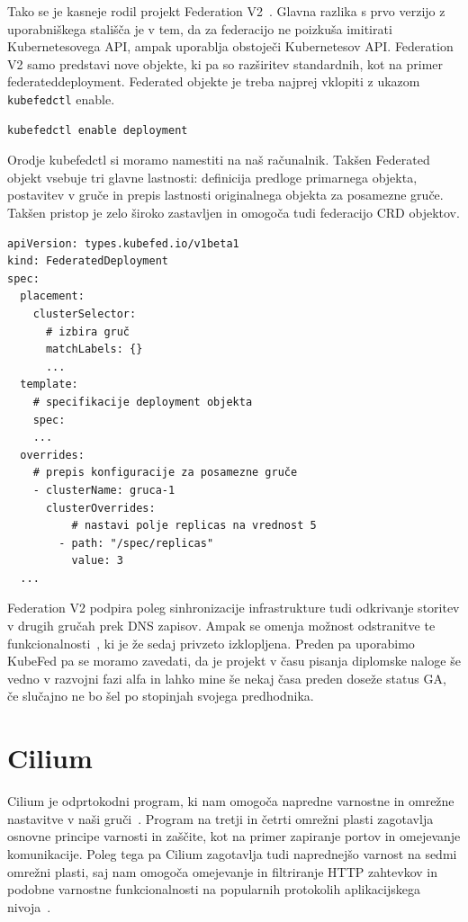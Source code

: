 \documentclass[a4paper, 12pt]{book}
\begin{document}
Tako se je kasneje rodil projekt Federation V2~\cite{Kubernetes-federation-evolution}.
Glavna razlika s prvo verzijo z uporabniškega stališča je v tem, da za federacijo ne poizkuša imitirati Kubernetesovega API, ampak uporablja obstoječi Kubernetesov API. 
Federation V2 samo predstavi nove objekte, ki pa so razširitev standardnih, kot na primer federateddeployment.
Federated objekte je treba najprej vklopiti z ukazom \verb|kubefedctl| enable.
\begin{verbatim}
kubefedctl enable deployment
\end{verbatim}
Orodje kubefedctl si moramo namestiti na naš računalnik.
Takšen Federated objekt vsebuje tri glavne lastnosti: definicija predloge primarnega objekta, postavitev v gruče in prepis lastnosti originalnega objekta za posamezne gruče.
  Takšen pristop je zelo široko zastavljen in omogoča tudi federacijo CRD objektov.
\begin{verbatim}
apiVersion: types.kubefed.io/v1beta1
kind: FederatedDeployment
spec:
  placement:
    clusterSelector:
      # izbira gruč
      matchLabels: {}
      ... 
  template:
    # specifikacije deployment objekta
    spec:
    ... 
  overrides:
    # prepis konfiguracije za posamezne gruče
    - clusterName: gruca-1
      clusterOverrides:
          # nastavi polje replicas na vrednost 5
        - path: "/spec/replicas"
          value: 3
  ... 
\end{verbatim}
Federation V2 podpira poleg sinhronizacije infrastrukture tudi odkrivanje storitev v drugih gručah prek DNS zapisov.
Ampak se omenja možnost odstranitve te funkcionalnosti~\cite{remove-service-discovery}, ki je že sedaj privzeto izklopljena.
Preden pa uporabimo KubeFed pa se moramo zavedati, da je projekt v času pisanja diplomske naloge še vedno v razvojni fazi alfa in lahko mine še nekaj časa preden doseže status GA, če slučajno ne bo šel po stopinjah svojega predhodnika.
\section{Cilium}
Cilium je odprtokodni program, ki nam omogoča napredne varnostne in omrežne nastavitve v naši gruči~\cite{cilium-intro}.
Program na tretji in četrti omrežni plasti zagotavlja osnovne principe varnosti in zaščite, kot na primer zapiranje portov in omejevanje komunikacije.
Poleg tega pa Cilium zagotavlja tudi naprednejšo varnost na sedmi omrežni plasti, saj nam omogoča omejevanje in filtriranje HTTP zahtevkov in podobne varnostne funkcionalnosti na popularnih protokolih aplikacijskega nivoja~\cite{cilium-intro}.
\end{document}
